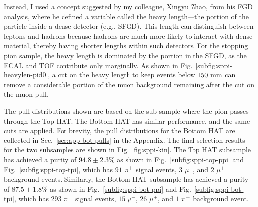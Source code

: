           Instead, I used a concept suggested by my colleague, Xingyu Zhao, from his FGD analysis, where he defined a variable called the heavy length—the portion of the particle inside a dense detector (e.g., SFGD).
          This length can distinguish between leptons and hadrons because hadrons are much more likely to interact with dense material, thereby having shorter lengths within such detectors.
          For the stopping pion sample, the heavy length is dominated by the portion in the SFGD, as the ECAL and TOF contribute only marginally.
          As shown in Fig.~\ref{subfig:sppi-heavylen-pid0}, a cut on the heavy length to keep events below $150~\textrm{mm}$ can remove a considerable portion of the muon background remaining after the cut on the muon pull.

          The pull distributions shown are based on the sub-sample where the pion passes through the Top HAT.
          The Bottom HAT has similar performance, and the same cuts are applied.
          For brevity, the pull distributions for the Bottom HAT are collected in Sec.~\ref{sec:app-bot-pulls} in the Appendix.
          The final selection results for the two subsamples are shown in Fig.~\ref{fig:sppi-kin}.
          The Top HAT subsample has achieved a purity of $94.8\pm2.3\%$ as shown in Fig.~\ref{subfig:sppi-top-ppi} and Fig.~\ref{subfig:sppi-top-tpi}, which has $91$ $\pi^+$ signal events, $3$ $\mu^-$, and $2$ $\mu^+$ background events.
          Similarly, the Bottom HAT subsample has achieved a purity of $87.5\pm1.8\%$ as shown in Fig.~\ref{subfig:sppi-bot-ppi} and Fig.~\ref{subfig:sppi-bot-tpi}, which has $293$ $\pi^+$ signal events, $15$ $\mu^-$, $26$ $\mu^+$, and $1$ $\pi^-$ background event.

